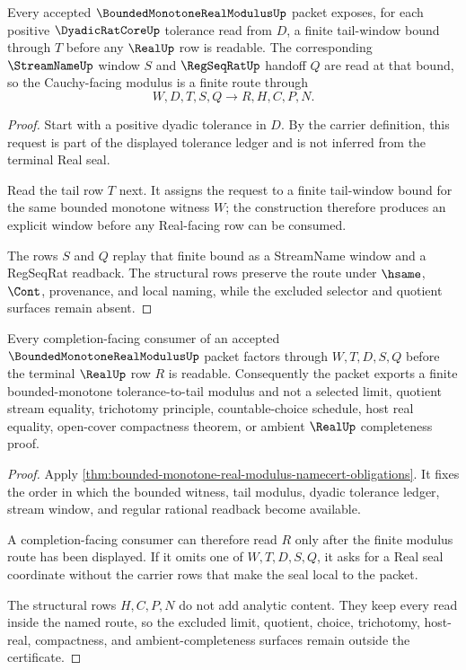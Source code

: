\begin{theorem}
\label{thm:bounded-monotone-real-cauchy-modulus}
Every accepted $\BoundedMonotoneRealModulusUp$ packet exposes, for each positive $\DyadicRatCoreUp$ tolerance read from $D$, a finite tail-window bound through $T$ before any $\RealUp$ row is readable. The corresponding $\StreamNameUp$ window $S$ and $\RegSeqRatUp$ handoff $Q$ are read at that bound, so the Cauchy-facing modulus is a finite route through
$$
W,D,T,S,Q \to R,H,C,P,N .
$$
\end{theorem}
\begin{proof}
Start with a positive dyadic tolerance in $D$. By the carrier definition, this request is part of the displayed tolerance ledger and is not inferred from the terminal Real seal.

Read the tail row $T$ next. It assigns the request to a finite tail-window bound for the same bounded monotone witness $W$; the construction therefore produces an explicit window before any Real-facing row can be consumed.

The rows $S$ and $Q$ replay that finite bound as a StreamName window and a RegSeqRat readback. The structural rows preserve the route under $\hsame$, $\Cont$, provenance, and local naming, while the excluded selector and quotient surfaces remain absent.
\end{proof}

\begin{theorem}
\label{thm:bounded-monotone-real-terminal-seal}
Every completion-facing consumer of an accepted $\BoundedMonotoneRealModulusUp$ packet factors through $W,T,D,S,Q$ before the terminal $\RealUp$ row $R$ is readable. Consequently the packet exports a finite bounded-monotone tolerance-to-tail modulus and not a selected limit, quotient stream equality, trichotomy principle, countable-choice schedule, host real equality, open-cover compactness theorem, or ambient $\RealUp$ completeness proof.
\end{theorem}
\begin{proof}
Apply \autoref{thm:bounded-monotone-real-modulus-namecert-obligations}. It fixes the order in which the bounded witness, tail modulus, dyadic tolerance ledger, stream window, and regular rational readback become available.

A completion-facing consumer can therefore read $R$ only after the finite modulus route has been displayed. If it omits one of $W,T,D,S,Q$, it asks for a Real seal coordinate without the carrier rows that make the seal local to the packet.

The structural rows $H,C,P,N$ do not add analytic content. They keep every read inside the named route, so the excluded limit, quotient, choice, trichotomy, host-real, compactness, and ambient-completeness surfaces remain outside the certificate.
\end{proof}

